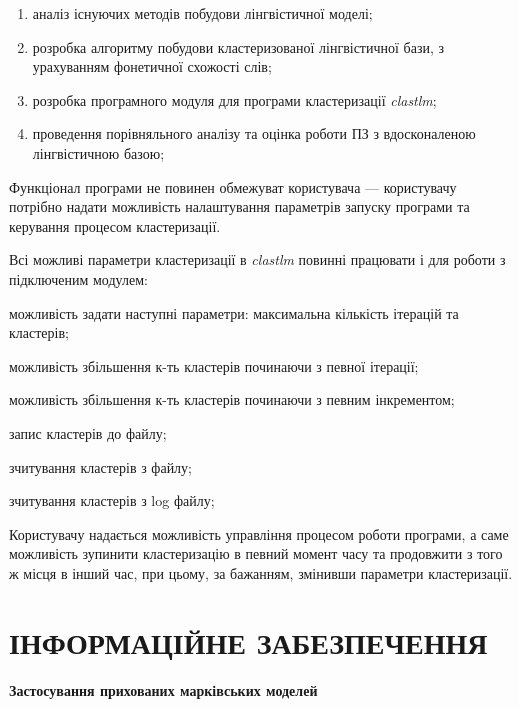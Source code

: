 \documentclass{diploma}
\begin{document}
\begin{enumerate}
\item аналіз існуючих методів побудови лінгвістичної моделі;
\item розробка алгоритму побудови кластеризованої лінгвістичної бази, з урахуванням фонетичної схожості слів;
\item розробка програмного модуля для програми кластеризації \emph{clastlm};
\item проведення порівняльного аналізу та оцінка роботи ПЗ з вдосконаленою лінгвістичною базою;
\end{enumerate}

Функціонал програми не повинен обмежуват користувача --- користувачу потрібно надати можливість налаштування параметрів запуску програми та керування процесом кластеризації.

Всі можливі параметри кластеризації в \emph{clastlm} повинні працювати і для роботи з підключеним модулем:

\begin{itemizer} 
\item можливість задати наступні параметри: максимальна кількість ітерацій та кластерів; 
\item можливість збільшення к-ть кластерів починаючи з певної ітерації; 
\item можливість збільшення к-ть кластерів починаючи з певним інкрементом;
\item запис кластерів до файлу;
\item зчитування кластерів з файлу;
\item зчитування кластерів з log файлу;
\end{itemizer}

Користувачу надається можливість управління процесом роботи програми, а саме можливість зупинити кластеризацію в певний момент часу та продовжити з того ж місця в інший час, при цьому, за бажанням, змінивши параметри кластеризації.





\chapter{ІНФОРМАЦІЙНЕ ЗАБЕЗПЕЧЕННЯ}



\textbf{Застосування прихованих марківських моделей}
\end{document}
